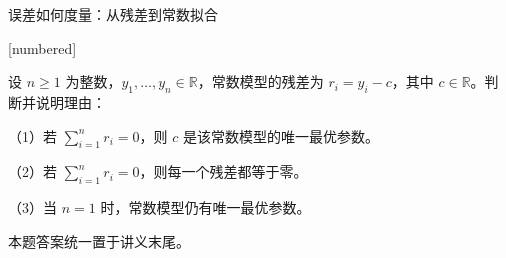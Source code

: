 \documentclass[aspectratio=169,10pt,fontset=fandol]{ctexbeamer}
\makeatletter
\newcommand{\mathagentexerciselabelcontext}[1]{%
\hypertarget<1>{#1}{}%
\edef\@currentHref{#1}%
}
\makeatother
\begin{document}
\begin{frame}[t,fragile]{误差如何度量：从残差到常数拟合}
\normalsize
{\normalsize
[numbered]
\mathagentexerciselabelcontext{mathagent.exercise.U0015.0}
\begin{exercise}
\label{mathagent:exercise:9e7dbf7ef17df1506f236bbf1ad6ff8c14ff13065df89e12b796d18475228be7}
设 $n\geq1$ 为整数，$y_1,\ldots,y_n\in\mathbb{R}$，常数模型的残差为 $r_i=y_i-c$，其中 $c\in\mathbb{R}$。判断并说明理由：

（1）若 $\sum_{i=1}^{n}r_i=0$，则 $c$ 是该常数模型的唯一最优参数。

（2）若 $\sum_{i=1}^{n}r_i=0$，则每一个残差都等于零。

（3）当 $n=1$ 时，常数模型仍有唯一最优参数。

本题答案统一置于讲义末尾。
\end{exercise}
}
\end{frame}
\end{document}
